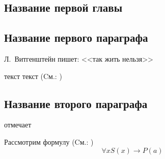 \newpage

\begin{center}
\section{Название первой главы} 		
\end{center}
\subsection{Название первого параграфа}

 \autocite{Benthem2012}

Л.~Витгенштейн пишет: <<так жить нельзя>> ~\cite{Wittgenstein1977}

текст текст (Cм.: \cite{Bar-Hillel})

\subsection{Название второго параграфа}

 \cite[c. 23]{Bulygina1997} отмечает

Рассмотрим формулу (Cм.: \cite{Bar-Hillel})
\begin{equation}
	\forall x S(x) \to P(a)
\end{equation}

